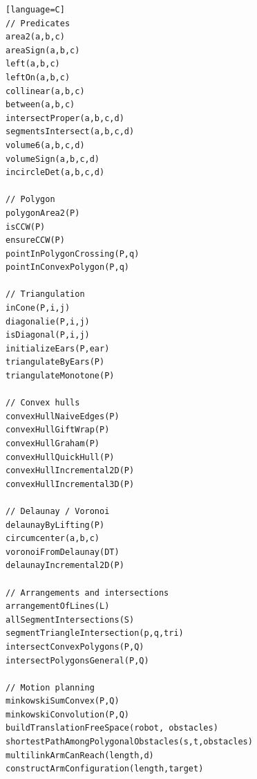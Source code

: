 \documentclass[11pt]{article}
\begin{document}
\begin{verbatim}[language=C]
// Predicates
area2(a,b,c)
areaSign(a,b,c)
left(a,b,c)
leftOn(a,b,c)
collinear(a,b,c)
between(a,b,c)
intersectProper(a,b,c,d)
segmentsIntersect(a,b,c,d)
volume6(a,b,c,d)
volumeSign(a,b,c,d)
incircleDet(a,b,c,d)

// Polygon
polygonArea2(P)
isCCW(P)
ensureCCW(P)
pointInPolygonCrossing(P,q)
pointInConvexPolygon(P,q)

// Triangulation
inCone(P,i,j)
diagonalie(P,i,j)
isDiagonal(P,i,j)
initializeEars(P,ear)
triangulateByEars(P)
triangulateMonotone(P)

// Convex hulls
convexHullNaiveEdges(P)
convexHullGiftWrap(P)
convexHullGraham(P)
convexHullQuickHull(P)
convexHullIncremental2D(P)
convexHullIncremental3D(P)

// Delaunay / Voronoi
delaunayByLifting(P)
circumcenter(a,b,c)
voronoiFromDelaunay(DT)
delaunayIncremental2D(P)

// Arrangements and intersections
arrangementOfLines(L)
allSegmentIntersections(S)
segmentTriangleIntersection(p,q,tri)
intersectConvexPolygons(P,Q)
intersectPolygonsGeneral(P,Q)

// Motion planning
minkowskiSumConvex(P,Q)
minkowskiConvolution(P,Q)
buildTranslationFreeSpace(robot, obstacles)
shortestPathAmongPolygonalObstacles(s,t,obstacles)
multilinkArmCanReach(length,d)
constructArmConfiguration(length,target)
\end{verbatim}
\end{document}
